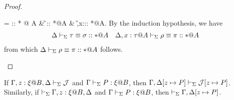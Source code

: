\begin{proof}
    \begin{rneqncase}{
            \QTAbs{}}{
             = \rho \E \pi :: * @ A &
            \G\V \tau \E \sigma :: *@A  & \G,x:\tau@A \V \rho \E \pi :: *@A.
            }
            By the induction hypothesis, we have
            \begin{align*}
                & \D\V \tau \E \sigma :: *@A &  & \D,x:\tau@A \V \rho \E \pi :: *@A
            \end{align*}
            from which \( \Delta\vdash_\Sigma \rho \equiv \pi :: * @ A \) follows.
    \end{rneqncase}
\end{proof}

\begin{lemma}
    \label{lemma:TermSubstitution}
    If $\G, z:\xi@B, \D \V \mathcal{J}$ and $\Gamma\vdash_\Sigma P:\xi @B$, then $\Gamma, \Delta[z \mapsto P] \vdash_\Sigma \mathcal{J}[z \mapsto P]$.  Similarly, if $\V \G, z:\xi@B, \D$ and
    $\Gamma\vdash_\Sigma P:\xi @B$, then $\vdash_\Sigma \Gamma, \Delta[z \mapsto P]$.
\end{lemma}

